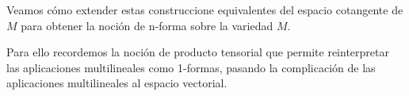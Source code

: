 \documentclass[../VD.tex]{subfiles}
\begin{document}
Veamos cómo extender estas construccione equivalentes del espacio cotangente de
\(M\) para obtener la noción de n-forma sobre la variedad \(M\).

Para ello recordemos la noción de producto tensorial que permite reinterpretar
las aplicaciones multilineales como 1-formas, pasando la complicación de las
aplicaciones multilineales al espacio vectorial.
\end{document}
